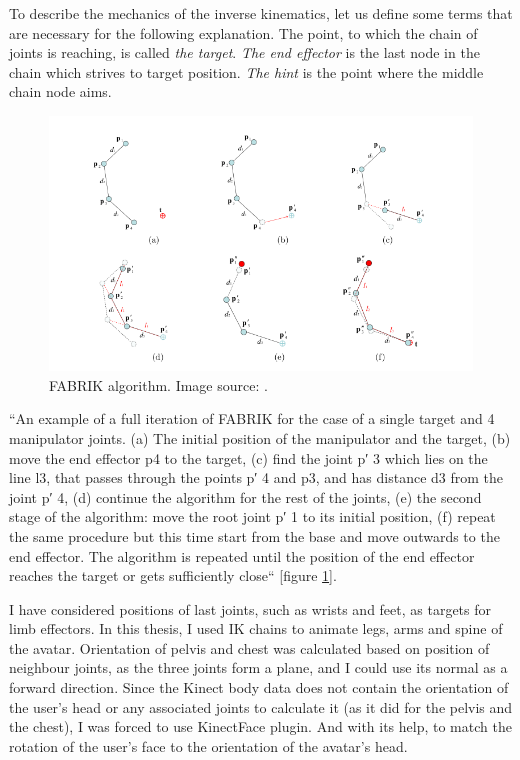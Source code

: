 \documentclass[a4paper]{report}
\begin{document}
 \qquad To describe the mechanics of the inverse kinematics, let us define some terms that are necessary for the following explanation. The point, to which the chain of joints is reaching, is called \textit{the target}. \textit{The end effector} is the last node in the chain which strives to target position. \textit{The hint} is the point where the middle chain node aims.

 \begin{figure}[H]
  \includegraphics[width=\textwidth, keepaspectratio]{images/Scemas/FABRIK.png}
  \caption{FABRIK algorithm. Image source: \cite{IKtechniques}.} 
  \label{fig:fabrik_alg}
\end{figure}
 
 
\bigskip “An example of a full iteration of FABRIK for the case of a single target and 4 manipulator joints. (a) The initial position of the manipulator and the target, (b) move the end effector p4 to the target, (c) find the joint p′ 3 which lies on the line l3, that passes through the points p′ 4 and p3, and has distance d3 from the joint p′ 4, (d) continue the algorithm for the rest of the joints, (e) the second stage of the algorithm: move the root joint p′ 1 to its initial position, (f) repeat the same procedure but this time start from the base and move outwards to the end effector. The algorithm is repeated until the position of the end effector reaches the target or gets sufficiently close“ \cite{IKtechniques} [figure \ref{fig:fabrik_alg}].

\bigskip I have considered positions of last joints, such as wrists and feet, as targets for limb effectors. In this thesis, I used IK chains to animate legs, arms and spine of the avatar.
Orientation of pelvis and chest was calculated based on position of neighbour joints, as the three joints form a plane, and I could use its normal as a forward direction.
Since the Kinect body data does not contain the orientation of the user's head or any associated joints to calculate it (as it did for the pelvis and the chest), I was forced to use KinectFace plugin. And with its help, to match the rotation of the user's face to the orientation of the avatar's head.
\end{document}
